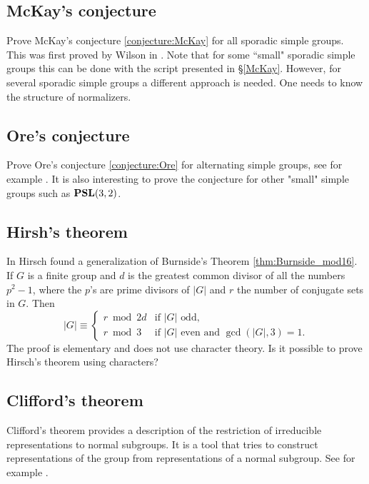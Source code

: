\subsection*{McKay's conjecture}

Prove McKay's conjecture \ref{conjecture:McKay} for all sporadic simple groups. 
This was first proved by Wilson in \cite{MR1643110}. 
Note that
for some ``small" sporadic simple groups this can be done
with the script presented in \S\ref{McKay}. However, 
for several sporadic simple groups a different approach is needed. One needs
to know the structure of normalizers. 

\subsection*{Ore's conjecture}

Prove Ore's conjecture \ref{conjecture:Ore} for alternating simple groups,
see for example \cite{MR40298}. It is also interesting to prove the conjecture
for other "small" simple groups such as $\mathbf{PSL}(3,2)$.  



\subsection*{Hirsh's theorem}

In \cite{MR36755} Hirsch found a generalization of Burnside's Theorem \ref{thm:Burnside_mod16}.  
If $G$ is a finite group and $d$ is the greatest common divisor of all 
the numbers $p^2-1$, where the $p$'s are prime divisors of $|G|$ and $r$ the number of conjugate sets in $G$. Then 
\[
|G|\equiv\begin{cases} 
    r\bmod 2d &\text{if $|G|$ odd,}\\
    r\bmod 3 & \text{if $|G|$ even and $\gcd(|G|,3)=1$.}
    \end{cases}
\]
The proof is elementary and does not use character theory. Is it possible
to prove Hirsch's theorem using characters?

\subsection*{Clifford's theorem}

Clifford’s theorem provides a description of the restriction of  irreducible representations to normal subgroups. It is a tool
that tries to construct representations of the group
from representations of a normal subgroup. See for example
\cite[Chapter 7]{MR3970262}. 

